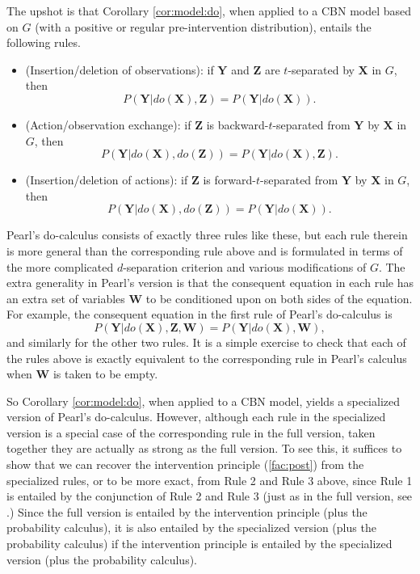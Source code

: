 \documentclass[12pt]{amsart}
\theoremstyle{plain}
\theoremstyle{definition}
\theoremstyle{remark}
\numberwithin{equation}{section}
\theoremstyle{plain}
\newcommand{\0}{\emptyset}
\begin{document}
The upshot is that Corollary \ref{cor:model:do}, when applied to a CBN model based on $G$ (with a positive or regular pre-intervention distribution), entails the following rules.
\begin{itemize}
    \item[{\it Rule 1}] (Insertion/deletion of observations): if $\mathbf{Y}$ and $\mathbf{Z}$ are $t$-separated by $\mathbf{X}$ in $G$, then \[ P(\mathbf{Y} | do(\mathbf{X}), \mathbf{Z}) = P(\mathbf{Y} | do(\mathbf{X})). \]

    \item[{\it Rule 2}] (Action/observation exchange): if $\mathbf{Z}$ is backward-$t$-separated from $\mathbf{Y}$ by $\mathbf{X}$ in $G$, then \[ P(\mathbf{Y} | do(\mathbf{X}), do(\mathbf{Z})) = P(\mathbf{Y} | do(\mathbf{X}), \mathbf{Z}). \]

    \item[{\it Rule 3}] (Insertion/deletion of actions): if $\mathbf{Z}$ is forward-$t$-separated from $\mathbf{Y}$ by $\mathbf{X}$ in $G$, then \[ P(\mathbf{Y} | do(\mathbf{X}), do(\mathbf{Z})) = P(\mathbf{Y} | do(\mathbf{X})). \]

\end{itemize}

Pearl's do-calculus \cite{Pearl1995} consists of exactly three rules like these, but each rule therein is more general than the corresponding rule above and is formulated in terms of the more complicated $d$-separation criterion and various modifications of $G$. The extra generality in Pearl's version is that the consequent equation in each rule has an extra set of variables $\mathbf{W}$ to be conditioned upon on both sides of the equation. For example, the consequent equation in the first rule of Pearl's do-calculus is \[ P(\mathbf{Y} | do(\mathbf{X}), \mathbf{Z}, \mathbf{W}) = P(\mathbf{Y} | do(\mathbf{X}), \mathbf{W}), \]
and similarly for the other two rules. It is a simple exercise to check that each of the rules above is exactly equivalent to the corresponding rule in Pearl's calculus when $\mathbf{W}$ is taken to be empty.

So Corollary \ref{cor:model:do}, when applied to a CBN model, yields a specialized version of Pearl's do-calculus. However, although each rule in the specialized version is a special case of the corresponding rule in the full version, taken together they are actually as strong as the full version. To see this, it suffices to show that we can recover the intervention principle (\ref{fac:post}) from the specialized rules, or to be more exact, from Rule 2 and Rule 3 above, since Rule 1 is entailed by the conjunction of Rule 2 and Rule 3 (just as in the full version, see \cite{HV2006}.) Since the full version is entailed by the intervention principle (plus the probability calculus), it is also entailed by the specialized version (plus the probability calculus) if the intervention principle is entailed by the specialized version (plus the probability calculus).
\end{document}
